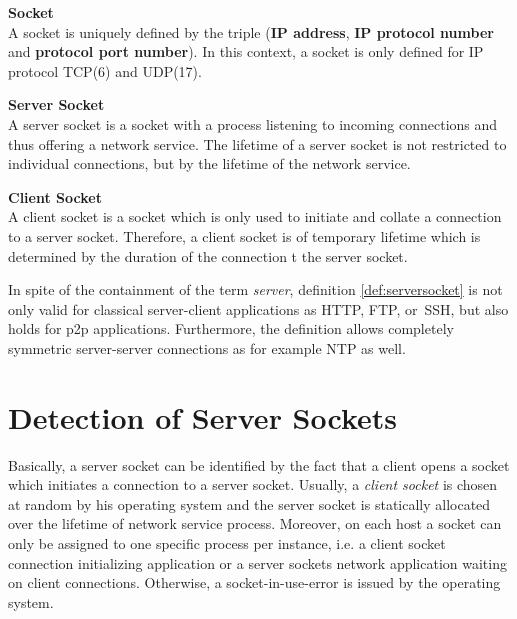 \parbox{
\textwidth}{
\begin{defn}
	{\textbf{Socket}\\} A socket is uniquely defined by the triple (\textbf{IP address}, \textbf{IP protocol number} and \textbf{protocol port number}). In this context, a socket is only defined for IP protocol \gls{TCP}(6) and \gls{UDP}(17).
\end{defn}
}
\parbox{
\textwidth}{
\begin{defn}
	{\textbf{Server Socket
	\label{def:serversocket}}\\} A server socket is a socket with a process listening to incoming connections and thus offering a network service. The lifetime of a server socket is not restricted to individual connections, but by the lifetime of the network service.
\end{defn}
}

\parbox{
\textwidth}{
\begin{defn}
	{\textbf{Client Socket}\\} A client socket is a socket which is only used to
	initiate and collate a connection to a server socket. Therefore, a client
	socket is of temporary lifetime which is determined by the duration of the
	connection t the server socket.
\end{defn}
}

In spite of the containment of the term \emph{server}, definition
\ref{def:serversocket} is not only valid for classical server-client
applications as \gls{HTTP}, \gls{FTP}, or \gls{SSH}, but also holds for
\gls{p2p} applications. Furthermore, the definition allows completely symmetric
server-server connections as for example \gls{NTP} as well.


\section{Detection of Server Sockets
\label{section:socket_detection}}

Basically, a \gls{server socket} can be identified by the fact that a client
opens a socket which initiates a connection to a \gls{server socket}. Usually,
a \emph{client socket} is chosen at random by his operating system and the
\gls{server socket} is statically allocated over the lifetime of network
service process. Moreover, on each host a socket can only be assigned to one
specific process per instance, i.e. a client socket connection initializing
application or a \glspl{server socket} network application waiting on client
connections. Otherwise, a socket-in-use-error is issued by the operating
system\citep{Schatzmann:Dissection}.

